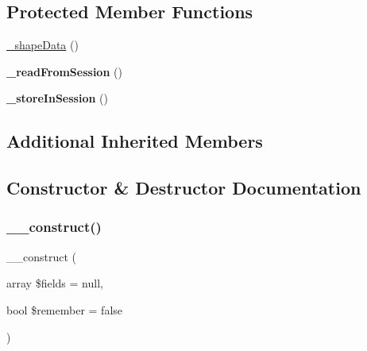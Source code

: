 \subsection*{Protected Member Functions}
\begin{DoxyCompactItemize}
\item 
\hyperlink{classhamburgscleanest_1_1_data_tables_1_1_models_1_1_data_components_1_1_sorter_a6d4fda1024fd883f0750e5f0c531160d}{\+\_\+shape\+Data} ()
\item 
\mbox{\label{classhamburgscleanest_1_1_data_tables_1_1_models_1_1_data_components_1_1_sorter_ae682ac7f1f1f9516c3cc2485ae5bcf4b}} 
{\bfseries \+\_\+read\+From\+Session} ()
\item 
\mbox{\label{classhamburgscleanest_1_1_data_tables_1_1_models_1_1_data_components_1_1_sorter_a28881ca4bf07d4008e3ed3128198da59}} 
{\bfseries \+\_\+store\+In\+Session} ()
\end{DoxyCompactItemize}
\subsection*{Additional Inherited Members}


\subsection{Constructor \& Destructor Documentation}
\mbox{\label{classhamburgscleanest_1_1_data_tables_1_1_models_1_1_data_components_1_1_sorter_a0d814929f87d0f11eeadf759faf05fcb}} 
\subsubsection{\texorpdfstring{\+\_\+\+\_\+construct()}{\_\_construct()}}
{\footnotesize\ttfamily \+\_\+\+\_\+construct (\begin{DoxyParamCaption}\item[{array}]{\$fields = {\ttfamily null},  }\item[{bool}]{\$remember = {\ttfamily false} }\end{DoxyParamCaption})}

